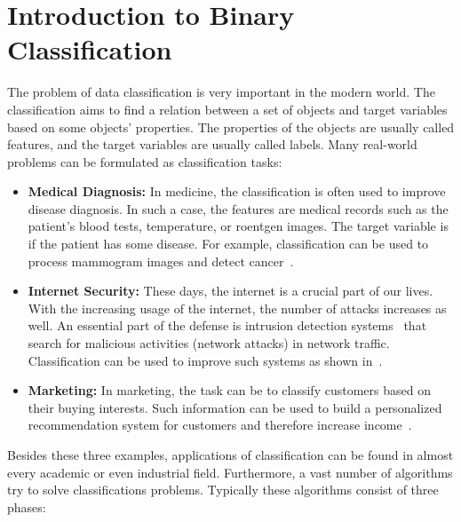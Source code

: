 \chapter{Introduction to Binary Classification}

The problem of data classification is very important in the modern world. The classification aims to find a relation between a set of objects and target variables based on some objects' properties. The properties of the objects are usually called features, and the target variables are usually called labels. Many real-world problems can be formulated as classification tasks:
\begin{itemize}
  \item \textbf{Medical Diagnosis:} In medicine, the classification is often used to improve disease diagnosis. In such a case, the features are medical records such as the patient's blood tests, temperature, or roentgen images. The target variable is if the patient has some disease. For example, classification can be used to process mammogram images and detect cancer~\cite{viale2012current, levy2016breast}.
  \item \textbf{Internet Security:} These days, the internet is a crucial part of our lives. With the increasing usage of the internet, the number of attacks increases as well. An essential part of the defense is intrusion detection systems~\cite{grill2016learning, scarfone2007guide} that search for malicious activities (network attacks) in network traffic. Classification can be used to improve such systems as shown in~\cite{giacinto2002intrusion, shanbhag2009accurate}.
  \item \textbf{Marketing:} In marketing, the task can be to classify customers based on their buying interests. Such information can be used to build a personalized recommendation system for customers and therefore increase income~\cite{kaefer2005neural, zhang2007building}.
\end{itemize}
Besides these three examples, applications of classification can be found in almost every academic or even industrial field. Furthermore, a vast number of algorithms try to solve classifications problems. Typically these algorithms consist of three phases:
